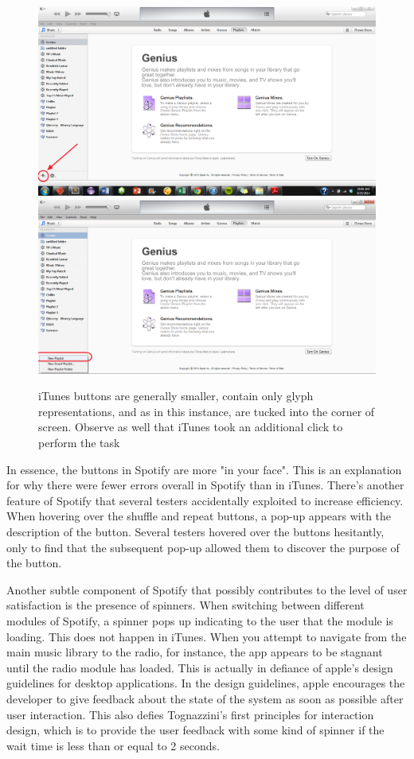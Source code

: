 \documentclass[12pt]{article}
\begin{document}
\begin{figure}[H]
	\centering
	\includegraphics[width=.4\textwidth]{chart7.png}
	\includegraphics[width=.4\textwidth]{chart9.png}
	\caption{iTunes buttons are generally smaller, contain 
only glyph representations, and as in this instance, are tucked 
into the corner of screen. Observe as well that iTunes took an additional click to perform the task}
\end{figure}



 In essence, the buttons in Spotify are more "in your face". This 
is an explanation for why there were fewer errors overall in 
Spotify than in iTunes. There's another feature of Spotify that 
several testers accidentally exploited to increase efficiency. 
When hovering over the shuffle and repeat buttons, a pop-up 
appears with the description of the button. Several testers 
hovered over the buttons hesitantly, only to find that the 
subsequent pop-up allowed them to discover the purpose of the 
button.

Another subtle component of Spotify that possibly contributes to 
the level of user satisfaction is the presence of spinners. When 
switching between different modules of Spotify, a spinner pops up 
indicating to the user that the module is loading. This does not 
happen in iTunes. When you attempt to navigate from the main music 
library to the radio, for instance, the app appears to be stagnant 
until the radio module has loaded. This is actually in defiance of 
apple's design guidelines  for desktop applications. In the design 
guidelines, apple encourages the developer to give feedback about the state of the system as 
soon as possible after user interaction. This also defies Tognazzini's first principles 
for interaction design, which is to provide the user feedback with 
some kind of spinner if the wait time is less than or equal to 2 
seconds.
\end{document}
